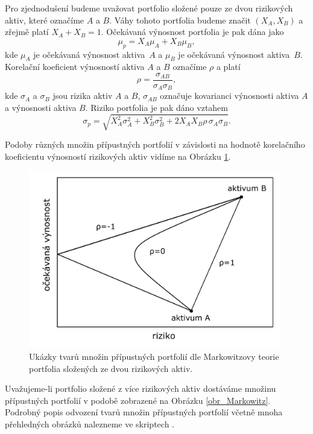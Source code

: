 \documentclass[a4paper,12pt]{report}
\theoremstyle{definition} \newtheorem{definice}[veta]{Definice}
\theoremstyle{remark}
\begin{document}
Pro zjednodušení budeme uvažovat portfolio složené pouze ze dvou rizikových aktiv, které označíme $A$ a $B$.
Váhy tohoto portfolia budeme značit $(X_A,X_B)$ a zřejmě platí $X_A+X_B=1$.
Očekávaná výnosnost portfolia je pak dána jako 
\begin{equation}
 \mu_p=X_A\mu_A+X_B\mu_B,
\end{equation}
kde $\mu_A$ je očekávaná výnosnost aktiva~$A$ a $\mu_B$ je očekávaná výnosnost aktiva~$B$.
Korelační koeficient výnosností aktiva $A$ a $B$ označíme $\rho$ a platí
\begin{equation}
 \rho=\frac{\sigma_{AB}}{\sigma_A\sigma_B},
\end{equation} 
kde $\sigma_A$ a $\sigma_B$ jsou rizika aktiv $A$ a $B$, $\sigma_{AB}$ označuje kovarianci výnosnosti aktiva $A$ a výnosnosti aktiva $B$.
Riziko portfolia je pak dáno vztahem
\begin{equation}
 \sigma_p=\sqrt{X_A^2\sigma_A^2+X_B^2\sigma_B^2+2X_AX_B\rho\,\sigma_A\sigma_B}.
\end{equation}

Podoby různých množin přípustných portfolií v závislosti na hodnotě korelačního koeficientu výnosností rizikových aktiv vidíme na Obrázku \ref{odvozeni_Markowitz}.
\begin{figure}[!htbp]\label{odvozeni_Markowitz}
  \centering 
  \includegraphics[width=11cm]{IMG/pripustna_portfolia.pdf}
  \caption{Ukázky tvarů množin přípustných portfolií  dle Markowitzovy teorie portfolia složených ze dvou rizikových aktiv.}
\label{odvozeni_Markowitz}
\end{figure}
Uvažujeme-li portfolio složené z více rizikových aktiv dostáváme množinu přípustných portfolií v podobě zobrazené na Obrázku \ref{obr_Markowitz}.
Podrobný popis odvození tvarů množin přípustných portfolií včetně mnoha přehledných obrázků nalezneme ve skriptech \cite{bradateorie}. 
\end{document}
